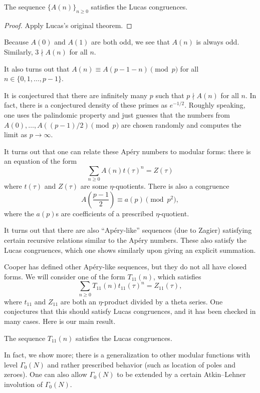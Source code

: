 \documentclass{article}
\begin{document}
\begin{theorem}
	The sequence $\{A(n)\}_{n\ge0}$ satisfies the Lucas congruences.
\end{theorem}
\begin{proof}
	Apply Lucas's original theorem.
\end{proof}
\begin{example}
	Because $A(0)$ and $A(1)$ are both odd, we see that $A(n)$ is always odd. Similarly, $3\nmid A(n)$ for all $n$.
\end{example}
\begin{remark}[Rowland]
	It also turns out that $A(n)\equiv A(p-1-n)\pmod p$ for all $n\in\{0,1,\ldots,p-1\}$.
\end{remark}
\begin{remark}
	It is conjectured that there are infinitely many $p$ such that $p\nmid A(n)$ for all $n$. In fact, there is a conjectured density of these primes as $e^{-1/2}$. Roughly speaking, one uses the palindomic property and just guesses that the numbers from $A(0),\ldots,A((p-1)/2)\pmod p$ are chosen randomly and computes the limit as $p\to\infty$.
\end{remark}
It turns out that one can relate these Ap\'ery numbers to modular forms: there is an equation of the form
\[\sum_{n\ge0}A(n)t(\tau)^n=Z(\tau)\]
where $t(\tau)$ and $Z(\tau)$ are some $\eta$-quotients. There is also a congruence
\[A\left(\frac{p-1}2\right)\equiv a(p)\pmod{p^2},\]
where the $a(p)$s are coefficients of a prescribed $\eta$-quotient.
\begin{remark}
	It turns out that there are also ``Ap\'ery-like'' sequences (due to Zagier) satisfying certain recursive relations similar to the Ap\'ery numbers. These also satisfy the Lucas congruences, which one shows similarly upon giving an explicit summation.
\end{remark}
Cooper has defined other Ap\'ery-like sequences, but they do not all have closed forms. We will consider one of the form $T_{11}(n)$, which satisfies 
\[\sum_{n\ge0}T_{11}(n)t_{11}(\tau)^n=Z_{11}(\tau),\]
where $t_{11}$ and $Z_{11}$ are both an $\eta$-product divided by a theta series. One conjectures that this should satisfy Lucas congruences, and it has been checked in many cases. Here is our main result.
\begin{theorem}
	The sequence $T_{11}(n)$ satisfies the Lucas congruences.
\end{theorem}
In fact, we show more; there is a generalization to other modular functions with level $\Gamma_0(N)$ and rather prescribed behavior (such as location of poles and zeroes). One can also allow $\Gamma_0(N)$ to be extended by a certain Atkin--Lehner involution of $\Gamma_0(N)$.
\end{document}

